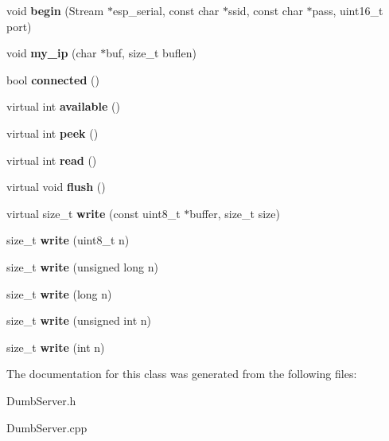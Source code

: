 \begin{DoxyCompactItemize}
\item 
\mbox{\label{class_esp_server_a1d032e732d4733905d676ef016fcd43c}} 
void {\bfseries begin} (Stream $\ast$esp\+\_\+serial, const char $\ast$ssid, const char $\ast$pass, uint16\+\_\+t port)
\item 
\mbox{\label{class_esp_server_a55995fd6398892be5768da85dde4f533}} 
void {\bfseries my\+\_\+ip} (char $\ast$buf, size\+\_\+t buflen)
\item 
\mbox{\label{class_esp_server_a6a25e008ded89de0e4599df7170008fb}} 
bool {\bfseries connected} ()
\item 
\mbox{\label{class_esp_server_aad68b4972f6b8426004feeef6e98d02d}} 
virtual int {\bfseries available} ()
\item 
\mbox{\label{class_esp_server_a005a9cd487f4ccb4ccef72197bf263b7}} 
virtual int {\bfseries peek} ()
\item 
\mbox{\label{class_esp_server_ae47512714818b3b9a1d29d2bf1f70fdf}} 
virtual int {\bfseries read} ()
\item 
\mbox{\label{class_esp_server_a05062a3ac7c70a79e991b66789384bf1}} 
virtual void {\bfseries flush} ()
\item 
\mbox{\label{class_esp_server_a0756c42343195dd1d1aa2f61c9b095bf}} 
virtual size\+\_\+t {\bfseries write} (const uint8\+\_\+t $\ast$buffer, size\+\_\+t size)
\item 
\mbox{\label{class_esp_server_aecc7262ee265fd78affe24f35e49e1bb}} 
size\+\_\+t {\bfseries write} (uint8\+\_\+t n)
\item 
\mbox{\label{class_esp_server_ae3ba71ceb4df9357d8e258efe3e79f4d}} 
size\+\_\+t {\bfseries write} (unsigned long n)
\item 
\mbox{\label{class_esp_server_ac256a11ccc8d32664729a7f5bfc71add}} 
size\+\_\+t {\bfseries write} (long n)
\item 
\mbox{\label{class_esp_server_afde7c57b12659422147d9a5e56b76148}} 
size\+\_\+t {\bfseries write} (unsigned int n)
\item 
\mbox{\label{class_esp_server_a2a49890c886a2b0569b11e02f986f867}} 
size\+\_\+t {\bfseries write} (int n)
\end{DoxyCompactItemize}


The documentation for this class was generated from the following files\+:\begin{DoxyCompactItemize}
\item 
Dumb\+Server.\+h\item 
Dumb\+Server.\+cpp\end{DoxyCompactItemize}
